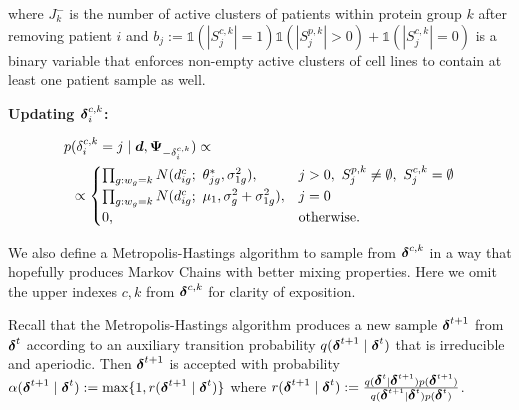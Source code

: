 \noindent where $J^-_k$ is the number of active clusters of patients within protein group $k$ after removing patient $i$ and $b_j:=\mathds{1}(|S^{c,k}_j| = 1)\mathds{1}(|S^{p,k}_j| > 0) + \mathds{1}(|S^{c,k}_j| = 0)$ is a binary variable that enforces non-empty active clusters of cell lines to contain at least one patient sample as well.



\textbf{Updating $\mbox{\boldmath $\delta$}^{c,k}_i$:}


\begin{align*}
p&(\delta^{c,k}_i = j \mid \mbox{\boldmath $d$}, \mbox{\boldmath $\Psi$}_{-\delta^{c,k}_i}) \propto\\
&\propto 
\begin{cases}
\prod_{g:w_g = k} N(d^c_{ig}; \ \theta^*_{jg}, \sigma^2_{1g}), &j>0, \ S^{p,k}_j \neq \emptyset, \ S^{c,k}_j=\emptyset \\
\prod_{g:w_g = k}N(d^c_{ig}; \ \mu_1, \sigma^2_{g}+ \sigma^2_{1g}), &j=0\\
0, &\mbox{otherwise.}
\end{cases}
\end{align*}

We also define a Metropolis-Hastings algorithm to sample from $\mbox{\boldmath $\delta$}^{c,k}$ in a way that hopefully produces Markov Chains with better mixing properties. Here we omit the upper indexes $c,k$ from $\mbox{\boldmath $\delta$}^{c,k}$ for clarity of exposition.

Recall that the Metropolis-Hastings algorithm produces a new sample $\mbox{\boldmath $\delta$}^{t+1}$ from $\mbox{\boldmath $\delta$}^t$ according to an auxiliary transition probability $q(\mbox{\boldmath $\delta$}^{t+1} \mid \mbox{\boldmath $\delta$}^t)$ that is irreducible and aperiodic. Then $\mbox{\boldmath $\delta$}^{t+1}$ is accepted with probability $\alpha(\mbox{\boldmath $\delta$}^{t+1} \mid \mbox{\boldmath $\delta$}^{t}):= \max\{1, r(\mbox{\boldmath $\delta$}^{t+1} \mid \mbox{\boldmath $\delta$}^{t})\}$ where $r(\mbox{\boldmath $\delta$}^{t+1} \mid \mbox{\boldmath $\delta$}^{t}):=\frac{q(\mbox{\boldmath $\delta$}^{t}\mid\mbox{\boldmath $\delta$}^{t+1})p(\mbox{\boldmath $\delta$}^{t+1})}{q(\mbox{\boldmath $\delta$}^{t+1}\mid\mbox{\boldmath $\delta$}^{t})p(\mbox{\boldmath $\delta$}^{t})}$.

